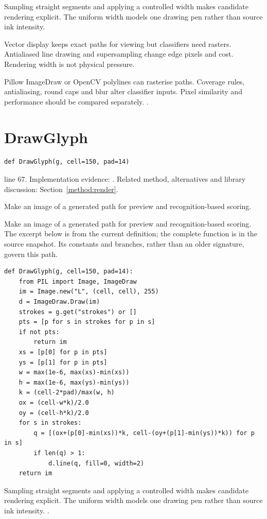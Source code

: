 Sampling straight segments and applying a controlled width makes candidate rendering explicit. The uniform width models one drawing pen rather than source ink intensity.


Vector display keeps exact paths for viewing but classifiers need rasters. Antialiased line drawing and supersampling change edge pixels and cost. Rendering width is not physical pressure.


Pillow ImageDraw or OpenCV polylines can rasterise paths. Coverage rules, antialiasing, round caps and blur alter classifier inputs. Pixel similarity and performance should be compared separately. \cite{pillowdraw,opencvdraw,code2026}.


\section{DrawGlyph}\label{fn:curate:DrawGlyph}
\begin{lstlisting}[style=sig]
def DrawGlyph(g, cell=150, pad=14)
\end{lstlisting}
 line 67. Implementation evidence: \cite{code2026}. Related method, alternatives and library discussion: Section~\ref{method:render}.


Make an image of a generated path for preview and recognition-based scoring.


Make an image of a generated path for preview and recognition-based scoring. The excerpt below is from the current definition; the complete function is in the source snapshot. Its constants and branches, rather than an older signature, govern this path.


\begin{lstlisting}[style=plain]
def DrawGlyph(g, cell=150, pad=14):
    from PIL import Image, ImageDraw
    im = Image.new("L", (cell, cell), 255)
    d = ImageDraw.Draw(im)
    strokes = g.get("strokes") or []
    pts = [p for s in strokes for p in s]
    if not pts:
        return im
    xs = [p[0] for p in pts]
    ys = [p[1] for p in pts]
    w = max(1e-6, max(xs)-min(xs))
    h = max(1e-6, max(ys)-min(ys))
    k = (cell-2*pad)/max(w, h)
    ox = (cell-w*k)/2.0
    oy = (cell-h*k)/2.0
    for s in strokes:
        q = [(ox+(p[0]-min(xs))*k, cell-(oy+(p[1]-min(ys))*k)) for p in s]
        if len(q) > 1:
            d.line(q, fill=0, width=2)
    return im
\end{lstlisting}
Sampling straight segments and applying a controlled width makes candidate rendering explicit. The uniform width models one drawing pen rather than source ink intensity. \cite{pillowdraw,opencvdraw,code2026}.


